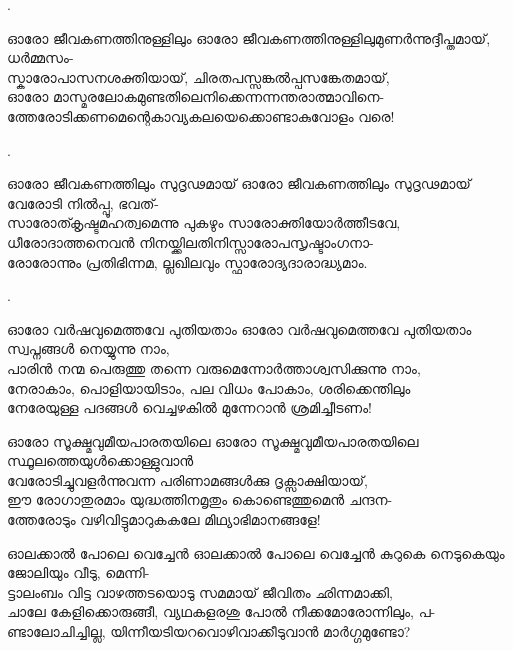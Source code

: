 \begin{enumerate}

.


\begin{slokam}{\VSv}{\VRV}{ഓരോ ജീവകണത്തിനുള്ളിലും}
ഓരോ ജീവകണത്തിനുള്ളിലുമുണർന്നുദ്ദീപ്തമായ്‌, ധർമ്മസം-\\
സ്കാരോപാസനശക്തിയായ്‌, ചിരതപസ്സങ്കൽപ്പസങ്കേതമായ്‌,\\
ഓരോ മാസ്മരലോകമുണ്ടതിലെനിക്കെന്നന്നന്തരാത്മാവിനെ-\\
ത്തേരോടിക്കണമെന്റെകാവ്യകലയെക്കൊണ്ടാകുവോളം വരെ!
\end{slokam}


.


\begin{slokam}{\VSv}{\KJ}{ഓരോ ജീവകണത്തിലും സുദൃഢമായ്}
ഓരോ ജീവകണത്തിലും സുദൃഢമായ് വേരോടി നിൽപ്പൂ, ഭവത്-\\
സാരോത്കൃഷ്ടമഹത്വമെന്നു പുകഴും സാരോക്തിയോർത്തീടവേ, \\
ധീരോദാത്തനെവൻ നിനയ്ക്കിലതിനിസ്സാരോപസൃഷ്ടാംഗനാ-\\
രോരോന്നും പ്രതിഭിന്നമ, ല്ലഖിലവും സ്ഫാരോദ്യദാരാദ്ധ്യമാം. 
\end{slokam}


. 


\begin{slokam}{\VSv}{\UN}{ഓരോ വർഷവുമെത്തവേ പുതിയതാം}
ഓരോ വർഷവുമെത്തവേ പുതിയതാം സ്വപ്നങ്ങൾ നെയ്യുന്നു നാം,\\
പാരിൻ നന്മ പെരുത്തു തന്നെ വരുമെന്നോർത്താശ്വസിക്കുന്നു നാം,\\
നേരാകാം, പൊളിയായിടാം, പല വിധം പോകാം, ശരിക്കെന്തിലും\\
നേരേയുള്ള പദങ്ങൾ വെച്ചഴകിൽ മുന്നേറാൻ ശ്രമിച്ചീടണം!
\end{slokam}


\begin{slokam}{\VSv}{\VRV}{ഓരോ സൂക്ഷ്മവുമീയപാരതയിലെ}
ഓരോ സൂക്ഷ്മവുമീയപാരതയിലെ സ്ഥൂലത്തെയുള്‍ക്കൊള്ളുവാന്‍ \\
വേരോടിച്ചുവളര്‍ന്നുവന്ന പരിണാമങ്ങള്‍ക്കു ദൃക്സാക്ഷിയായ്‌, \\
ഈ രോഗാതുരമാം യുദ്ധത്തിനമൃതും കൊണ്ടെത്തുമെന്‍ ചന്ദന- \\
ത്തേരോടും വഴിവിട്ടുമാറുകകലേ മിഥ്യാഭിമാനങ്ങളേ! 
\end{slokam}



\begin{slokam}{\VSr}{\UN}{ഓലക്കാൽ പോലെ വെച്ചേൻ}
ഓലക്കാൽ പോലെ വെച്ചേൻ കുറുകെ നെടുകെയും ജോലിയും വീടു, മെന്നി-\\
ട്ടാലംബം വിട്ട വാഴത്തടയൊടു സമമായ് ജീവിതം ഛിന്നമാക്കി,\\
ചാലേ കേളിക്കൊരുങ്ങീ, വ്യഥകളരശു പോൽ നീക്കമോരോന്നിലും, പ-\\
ണ്ടാലോചിച്ചില്ല, യിന്നീയടിയറവൊഴിവാക്കീടുവാൻ മാർഗ്ഗമുണ്ടോ?
\end{slokam}




\end{enumerate}

